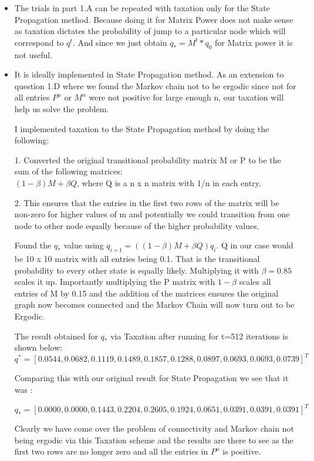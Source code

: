 \documentclass[11pt]{article}
\begin{document}
\begin{itemize}
	
\item The trials in part 1.A can be repeated with taxation only for the State Propagation method. Because doing it for Matrix Power does not make sense as taxation dictates the probability of jump to a particular node which will correspond to $q^t$. And since we just obtain $q_*= M^t *q_0$ for Matrix power it is not useful.

\item It is ideally implemented in State Propagation method. As an extension to question 1.D where we found the Markov chain not to be ergodic since not for all entries $P^n$ or $M^n$ were not positive for large enough n, our taxation will help us solve the problem.

I implemented taxation to the State Propagation method by doing the following:

1. Converted the original transitional probability matrix M or P to be the sum of the following matrices:\\
$(1- \beta) M + \beta Q$, where Q is a n x n matrix with 1/n in each entry.

2. This ensures that the entries in the first two rows of the matrix will be non-zero for higher values of m and potentially we could transition from one node to other node equally because of the higher probability values.

Found the $q_*$ value using $q_{i+1}=((1- \beta) M + \beta Q)q_i$. Q in our case would be 10 x 10 matrix with all entries being 0.1. That is the transitional probability to every other state is equally likely. Multiplying it with $\beta=0.85$ scales it up. Importantly multiplying the P matrix with $1 -\beta$ scales all entries of M by 0.15 and the addition of the matrices ensures the original graph now becomes connected and the Markov Chain will now turn out to be Ergodic.
 
The result obtained for $q_*$ via Taxation after running for t=512 iterations is shown below:\\

$\boxed{q^*= [0.0544,
0.0682,
0.1119,
0.1489,
0.1857,
0.1288,
0.0897,
0.0693,
0.0693,
0.0739]^T}$

Comparing this with our original result for State Propagation we see that it was :

	$\boxed{q_* = [ 0.0000,
		0.0000,
		0.1443,
		0.2204,
		0.2605,
		0.1924,
		0.0651,
		0.0391,
		0.0391,
		0.0391]^T}$

Clearly we have come over the problem of connectivity and Markov chain not being ergodic via this Taxation scheme and the results are there to see as the first two rows are no longer zero and all the entries in $P^n$ is positive.

\end{itemize}
\end{document}
